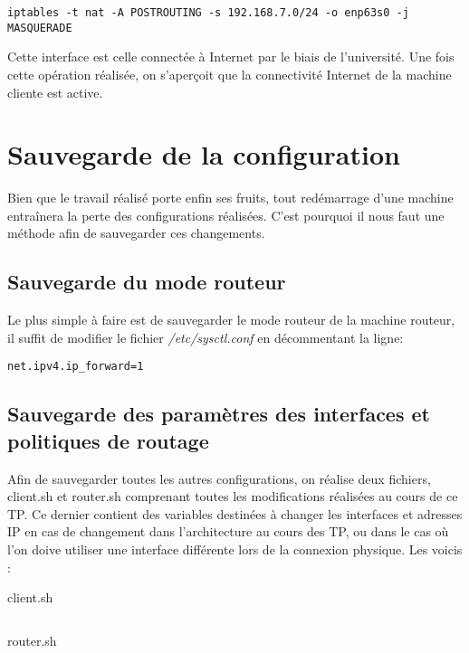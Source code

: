 \begin{verbatim}
iptables -t nat -A POSTROUTING -s 192.168.7.0/24 -o enp63s0 -j MASQUERADE
\end{verbatim}

Cette interface est celle connectée à Internet par le biais de l'université. Une fois cette opération réalisée, on s'aperçoit que la connectivité Internet de la machine cliente est active.

\section{Sauvegarde de la configuration}
Bien que le travail réalisé porte enfin ses fruits, tout redémarrage d'une machine entraînera la perte des configurations réalisées. C'est pourquoi il nous faut une méthode afin de sauvegarder ces changements.

\subsection{Sauvegarde du mode routeur}
Le plus simple à faire est de sauvegarder le mode routeur de la machine routeur, il suffit de modifier le fichier \textit{/etc/sysctl.conf} en décommentant la ligne:

\begin{verbatim}
net.ipv4.ip_forward=1
\end{verbatim}

\subsection{Sauvegarde des paramètres des interfaces et politiques de routage}
Afin de sauvegarder toutes les autres configurations, on réalise deux fichiers, client.sh et router.sh comprenant toutes les modifications réalisées au cours de ce TP. Ce dernier contient des variables destinées à changer les interfaces et adresses IP en cas de changement dans l'architecture au cours des TP, ou dans le cas où l'on doive utiliser une interface différente lors de la connexion physique. Les voicis :

client.sh
\inputminted[linenos]{bash}{../sources/TP2/client.sh}
router.sh
\inputminted[linenos]{bash}{../sources/TP2/router.sh}
